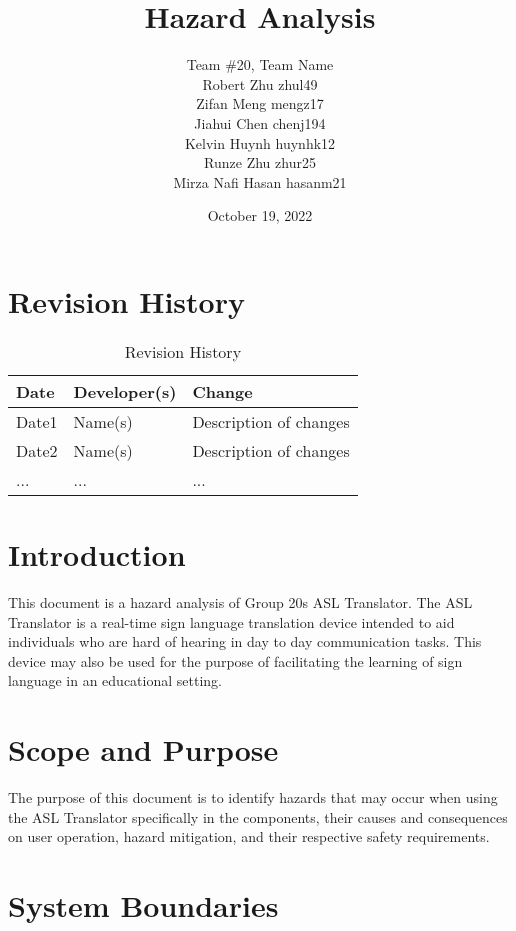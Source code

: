 \documentclass{article}
\title{Hazard Analysis\\\progname}
\author{\authname}
\author{Team \#20, Team Name
\\ Robert Zhu zhul49
\\ Zifan Meng mengz17
\\ Jiahui Chen chenj194
\\ Kelvin Huynh huynhk12
\\ Runze Zhu zhur25
\\ Mirza Nafi Hasan hasanm21
}
\date{October 19, 2022}
\begin{document}
\maketitle

\tableofcontents

\section*{Revision History}
\begin{table}[hp]
\caption{Revision History} \label{TblRevisionHistory}
\begin{tabularx}{\textwidth}{llX}
\toprule
\textbf{Date} & \textbf{Developer(s)} & \textbf{Change}\\
\midrule
Date1 & Name(s) & Description of changes\\
Date2 & Name(s) & Description of changes\\
... & ... & ...\\
\bottomrule
\end{tabularx}
\end{table}

\newpage

\section{Introduction}

This document is a hazard analysis of Group 20\textquotesingle s ASL Translator. The ASL Translator is a real-time sign language translation device intended to aid 
individuals who are hard of hearing in day to day communication tasks. This device may also be used for the purpose of facilitating the learning of 
sign language in an educational setting.\\

\section{Scope and Purpose}

The purpose of this document is to identify hazards that may occur when using the ASL Translator specifically in the components, their causes and consequences on user 
operation, hazard mitigation, and their respective safety requirements.\\

\section{System Boundaries}
\end{document}
